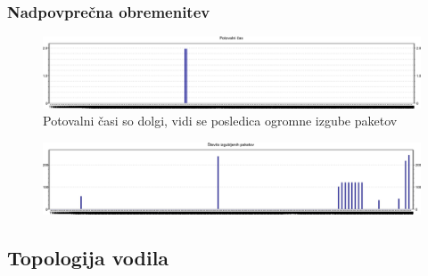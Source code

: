 \documentclass[11pt,a4paper,slovene]{myarticle}
\begin{document}
\subsubsection{Nadpovprečna obremenitev}
\begin{figure}[H]
\includegraphics[scale=0.45]{slike/tree/NADpotovalniCas.png}
\caption{Potovalni časi so dolgi, vidi se posledica ogromne izgube paketov}
\end{figure}
\begin{figure}[H]
\includegraphics[scale=0.45]{slike/tree/NADstIzgubljenihPaketov.png}
\end{figure}

\subsection{Topologija vodila}
\end{document}

